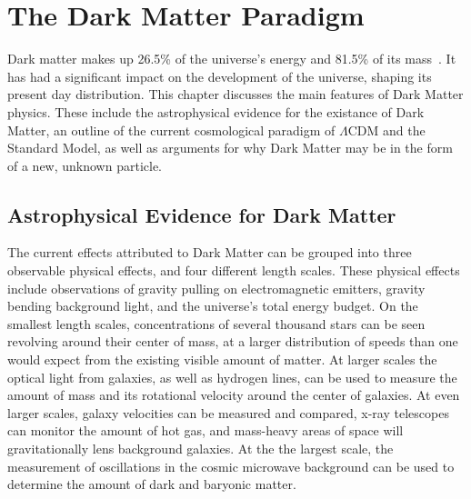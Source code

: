 \cleartooddpage[\thispagestyle{empty}]
\chapter{The Dark Matter Paradigm}\label{ch_dm}

  Dark matter makes up 26.5\% of the universe's energy and 81.5\% of its mass~\cite{planck2015}.
  It has had a significant impact on the development of the universe, shaping its present day distribution.
  This chapter discusses the main features of Dark Matter physics.
  These include the astrophysical evidence for the existance of Dark Matter, an outline of the current cosmological paradigm of $\Lambda$CDM and the Standard Model, as well as arguments for why Dark Matter may be in the form of a new, unknown particle.


\section{Astrophysical Evidence for Dark Matter}
  
  The current effects attributed to Dark Matter can be grouped into three observable physical effects, and four different length scales.
  These physical effects include observations of gravity pulling on electromagnetic emitters, gravity bending background light, and the universe's total energy budget.
  On the smallest length scales, concentrations of several thousand stars can be seen revolving around their center of mass, at a larger distribution of speeds than one would expect from the existing visible amount of matter.
  At larger scales the optical light from galaxies, as well as hydrogen lines, can be used to measure the amount of mass and its rotational velocity around the center of galaxies.
  At even larger scales, galaxy velocities can be measured and compared, x-ray telescopes can monitor the amount of hot gas, and mass-heavy areas of space will gravitationally lens background galaxies.
  At the the largest scale, the measurement of oscillations in the cosmic microwave background can be used to determine the amount of dark and baryonic matter.
  
